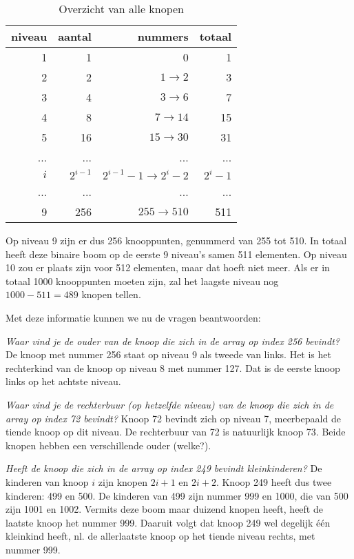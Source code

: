 \begin{oef}
\begin{opl}
\begin{table}[ht]
  \centering
  \caption{Overzicht van alle knopen}
  \begin{tabular}{rrrr}
    \toprule 
niveau & aantal & nummers & totaal \\
\midrule
1 & 1 & 0 & 1\\
2 & 2 & $1 \rightarrow 2$ & 3\\
3 & 4 & $3 \rightarrow 6$ & 7\\
4 & 8 & $7 \rightarrow 14$ & 15\\
5 & 16 & $15 \rightarrow 30$ & 31\\
... & ... & ... & ...\\
$i$ & $2^{i-1}$ & $2^{i-1}-1 \rightarrow 2^i-2$ & $2^i - 1$\\
... & ... & ... & ...\\
9 & 256 & $255 \rightarrow 510$ & 511\\
\bottomrule
  \end{tabular}
  \label{tbl:1000knopen}
\end{table}
Op niveau 9 zijn er dus 256 knooppunten, genummerd van 255 tot 510. In totaal heeft deze binaire boom op de eerste 9 niveau's samen 511 elementen. Op niveau 10 zou er plaats zijn voor 512 elementen, maar dat hoeft niet meer. Als er in totaal 1000 knooppunten moeten zijn, zal het laagste niveau nog $1000-511=489$ knopen tellen.

Met deze informatie kunnen we nu de vragen beantwoorden:
\begin{oefenumerate}
	\item \emph{Waar vind je de ouder van de knoop die zich in de array op index 256 bevindt?} De knoop met nummer 256 staat op niveau 9 als tweede van links. Het is het rechterkind van de knoop op niveau 8 met nummer 127. Dat is de eerste knoop links op het achtste niveau.
	\item \emph{Waar vind je de rechterbuur (op hetzelfde niveau) van de knoop die zich in de array op index 72 bevindt?} Knoop 72 bevindt zich op niveau 7, meerbepaald de tiende knoop op dit niveau. De rechterbuur van 72 is natuurlijk knoop 73. Beide knopen hebben een verschillende ouder (welke?).
	\item \emph{Heeft de knoop die zich in de array op index 249 bevindt kleinkinderen?} De kinderen van knoop $i$ zijn knopen $2i+1$ en $2i+2$. Knoop 249 heeft dus twee kinderen: 499 en 500. De kinderen van 499 zijn nummer 999 en 1000, die van 500 zijn 1001 en 1002. Vermits deze boom maar duizend knopen heeft, heeft de laatste knoop het nummer 999. Daaruit volgt dat knoop 249 wel degelijk één kleinkind heeft, nl. de allerlaatste knoop op het tiende niveau rechts, met nummer 999.
\end{oefenumerate}
\end{opl}

\end{oef}


